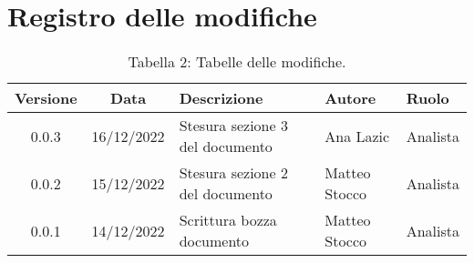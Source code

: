 \section*{Registro delle modifiche}
\begin{table}[H]
	\centering
	\renewcommand\tabularxcolumn[1]{>{\Centering}m{#1}}
	\begin{tabularx}{\textwidth}{| c | c | X | X | X |} 
	\hline
	\textbf{Versione} & \textbf{Data} & \textbf{Descrizione} & \textbf{Autore} & \textbf{Ruolo}\\
     \hline
	0.0.3 & 16/12/2022 & Stesura sezione 3 del documento & Ana Lazic & Analista \\
	\hline
	0.0.2 & 15/12/2022 & Stesura sezione 2 del documento & Matteo Stocco & Analista \\
	\hline
	0.0.1 & 14/12/2022 & Scrittura bozza documento & Matteo Stocco & Analista \\
	\hline
	\end{tabularx}
	\vspace{10pt}
	\caption{Tabella 2: Tabelle delle modifiche.}
\end{table}
